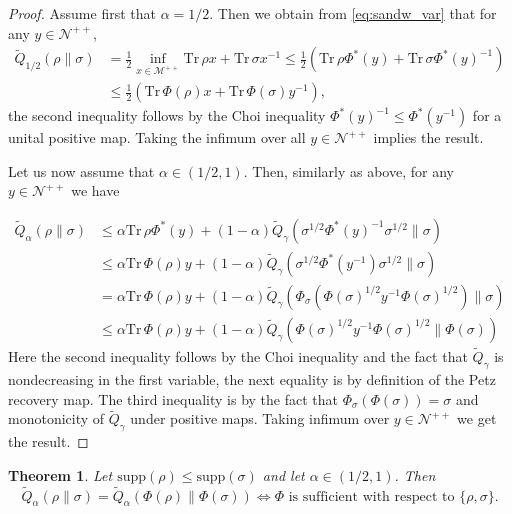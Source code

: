 \documentclass[12pt]{article}
\newtheorem{theorem}{Theorem}
\theoremstyle{definition}
\theoremstyle{remark}
\def\supp{\mathrm{supp}}
\def\Tr{\mathrm{Tr}\,}
\def\Me{\mathcal M}
\def\Ne{\mathcal N}
\begin{document}
\begin{proof} Assume first that $\alpha=1/2$. Then we obtain from \eqref{eq:sandw_var}
that for any $y\in \Ne^{++}$,
\begin{align*}
\tilde Q_{1/2}(\rho\|\sigma)&=\frac12\inf_{x\in \Me^{++}} \Tr \rho
x+\Tr\sigma x^{-1}\le \frac12(\Tr\rho\Phi^*(y) +\Tr\sigma \Phi^*(y)^{-1})\\
&\le \frac12(\Tr\Phi(\rho)x+ \Tr\Phi(\sigma)y^{-1}),
\end{align*}
the second inequality follows by the  Choi inequality $\Phi^*(y)^{-1}\le \Phi^*(y^{-1})$
for a unital positive map. Taking the infimum over all $y\in \Ne^{++}$ implies the result.

Let us now assume that $\alpha\in (1/2,1)$. Then, similarly as above, for any $y\in \Ne^{++}$ we have

\begin{align*}
\tilde Q_\alpha(\rho\|\sigma)&\le \alpha \Tr \rho\Phi^*(y)+(1-\alpha)\tilde
Q_\gamma(\sigma^{1/2}\Phi^*(y)^{-1}\sigma^{1/2}\|\sigma)\\
&\le \alpha\Tr\Phi(\rho)y+(1-\alpha)\tilde
Q_\gamma(\sigma^{1/2}\Phi^*(y^{-1})\sigma^{1/2}\|\sigma)\\
&= \alpha\Tr\Phi(\rho)y+(1-\alpha)\tilde
Q_\gamma(\Phi_\sigma(\Phi(\sigma)^{1/2}y^{-1}\Phi(\sigma)^{1/2})\|\sigma)\\
&\le \alpha\Tr\Phi(\rho)y+(1-\alpha)\tilde
Q_\gamma(\Phi(\sigma)^{1/2}y^{-1}\Phi(\sigma)^{1/2}\|\Phi(\sigma))
\end{align*}
Here the second inequality follows by the Choi inequality and the fact that $\tilde
Q_\gamma$ is nondecreasing in the first variable,  the next equality is by definition of
the Petz recovery map. The third inequality is by the fact that
$\Phi_\sigma(\Phi(\sigma))=\sigma$ and monotonicity of $\tilde Q_\gamma$ under positive
maps. Taking infimum over $y\in \Ne^{++}$ we get the result.



\end{proof}

\begin{theorem}\label{thm:suff_equality} Let $\supp (\rho)\le\supp(\sigma)$ and let $\alpha\in
(1/2,1)$. Then
\[
\tilde Q_\alpha(\rho\|\sigma)=\tilde Q_\alpha(\Phi(\rho)\|\Phi(\sigma))\iff \Phi\text{ is
sufficient with respect to }\{\rho,\sigma\}.
\]
\end{theorem}
\end{document}
